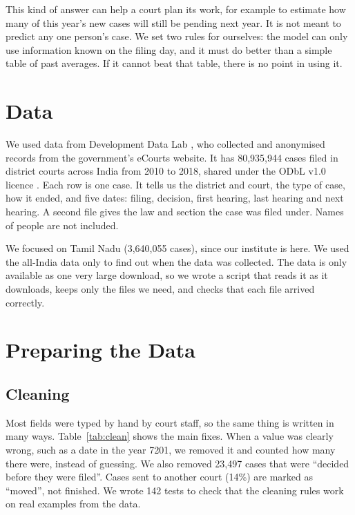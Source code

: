 \documentclass[11pt,a4paper]{article}
\begin{document}
This kind of answer can help a court plan its work, for example to estimate how many of this year's
new cases will still be pending next year. It is not meant to predict any one person's case. We
set two rules for ourselves: the model can only use information known on the filing day, and it
must do better than a simple table of past averages. If it cannot beat that table, there is no
point in using it.

\section{Data}
We used data from Development Data Lab \cite{ddl}, who collected and anonymised records from the
government's eCourts website. It has 80,935,944 cases filed in district courts across India from
2010 to 2018, shared under the ODbL v1.0 licence \cite{odbl}. Each row is one case. It tells us the
district and court, the type of case, how it ended, and five dates: filing, decision, first
hearing, last hearing and next hearing. A second file gives the law and section the case was filed
under. Names of people are not included.

We focused on Tamil Nadu (3,640,055 cases), since our institute is here. We used the all-India data
only to find out when the data was collected. The data is only available as one very large
download, so we wrote a script that reads it as it downloads, keeps only the files we need, and
checks that each file arrived correctly.

\section{Preparing the Data}

\subsection{Cleaning}
Most fields were typed by hand by court staff, so the same thing is written in many ways.
Table~\ref{tab:clean} shows the main fixes. When a value was clearly wrong, such as a date in the
year 7201, we removed it and counted how many there were, instead of guessing. We also removed
23,497 cases that were ``decided before they were filed''. Cases sent to another court (14\%) are
marked as ``moved'', not finished. We wrote 142 tests to check that the cleaning rules work on real
examples from the data.
\end{document}

